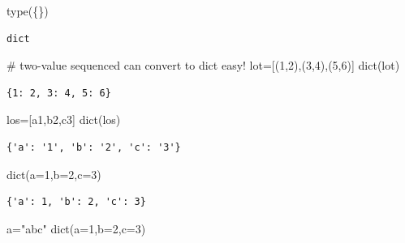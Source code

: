 \documentclass[
  letterpaper,
  DIV=11,
  numbers=noendperiod]{scrreprt}
\newenvironment{Shaded}{\begin{snugshade}}{\end{snugshade}}
\newcommand{\BuiltInTok}[1]{\textcolor[rgb]{0.00,0.23,0.31}{#1}}
\newcommand{\CommentTok}[1]{\textcolor[rgb]{0.37,0.37,0.37}{#1}}
\newcommand{\DecValTok}[1]{\textcolor[rgb]{0.68,0.00,0.00}{#1}}
\newcommand{\NormalTok}[1]{\textcolor[rgb]{0.00,0.23,0.31}{#1}}
\newcommand{\OperatorTok}[1]{\textcolor[rgb]{0.37,0.37,0.37}{#1}}
\newcommand{\StringTok}[1]{\textcolor[rgb]{0.13,0.47,0.30}{#1}}
\begin{document}
\begin{Shaded}
\begin{Highlighting}[]
\BuiltInTok{type}\NormalTok{(\{\})}
\end{Highlighting}
\end{Shaded}

\begin{verbatim}
dict
\end{verbatim}

\begin{Shaded}
\begin{Highlighting}[]
\CommentTok{\# two{-}value sequenced can convert to dict easy!}
\NormalTok{lot}\OperatorTok{=}\NormalTok{[(}\DecValTok{1}\NormalTok{,}\DecValTok{2}\NormalTok{),(}\DecValTok{3}\NormalTok{,}\DecValTok{4}\NormalTok{),(}\DecValTok{5}\NormalTok{,}\DecValTok{6}\NormalTok{)]}
\BuiltInTok{dict}\NormalTok{(lot)}
\end{Highlighting}
\end{Shaded}

\begin{verbatim}
{1: 2, 3: 4, 5: 6}
\end{verbatim}

\begin{Shaded}
\begin{Highlighting}[]
\NormalTok{los}\OperatorTok{=}\NormalTok{[}\StringTok{\textquotesingle{}a1\textquotesingle{}}\NormalTok{,}\StringTok{\textquotesingle{}b2\textquotesingle{}}\NormalTok{,}\StringTok{\textquotesingle{}c3\textquotesingle{}}\NormalTok{]}
\BuiltInTok{dict}\NormalTok{(los)}
\end{Highlighting}
\end{Shaded}

\begin{verbatim}
{'a': '1', 'b': '2', 'c': '3'}
\end{verbatim}

\begin{Shaded}
\begin{Highlighting}[]
\BuiltInTok{dict}\NormalTok{(a}\OperatorTok{=}\DecValTok{1}\NormalTok{,b}\OperatorTok{=}\DecValTok{2}\NormalTok{,c}\OperatorTok{=}\DecValTok{3}\NormalTok{)}
\end{Highlighting}
\end{Shaded}

\begin{verbatim}
{'a': 1, 'b': 2, 'c': 3}
\end{verbatim}

\begin{Shaded}
\begin{Highlighting}[]
\NormalTok{a}\OperatorTok{=}\StringTok{"abc"}
\BuiltInTok{dict}\NormalTok{(a}\OperatorTok{=}\DecValTok{1}\NormalTok{,b}\OperatorTok{=}\DecValTok{2}\NormalTok{,c}\OperatorTok{=}\DecValTok{3}\NormalTok{)}
\end{Highlighting}
\end{Shaded}
\end{document}
